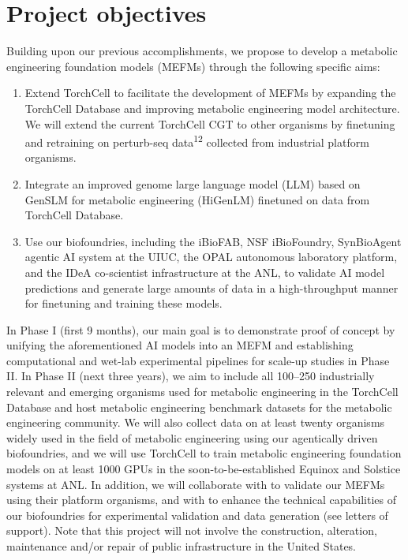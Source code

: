 
\section{Project objectives}\label{sec:objectives}

Building upon our previous accomplishments, we propose to develop a metabolic
engineering foundation models (MEFMs) through the following specific aims:

\begin{enumerate}
  \item Extend TorchCell to facilitate the development of MEFMs by expanding the
    TorchCell Database and improving metabolic engineering model architecture. We
    will extend the current TorchCell CGT to other organisms by finetuning and
    retraining on perturb-seq data\textsuperscript{12} collected from industrial
    platform organisms.
  \item Integrate an improved genome large language model (LLM) based on GenSLM for
    metabolic engineering (HiGenLM) finetuned on data from TorchCell Database.
  \item Use our biofoundries, including the iBioFAB, NSF iBioFoundry, SynBioAgent
    agentic AI system at the UIUC, the OPAL autonomous laboratory platform, and the
    IDeA co-scientist infrastructure at the ANL, to validate AI model predictions and
    generate large amounts of data in a high-throughput manner for finetuning and
    training these models.
\end{enumerate}

In Phase I (first 9 months), our main goal is to demonstrate proof of concept by
unifying the aforementioned AI models into an MEFM and establishing computational and
wet-lab experimental pipelines for scale-up studies in Phase II. In Phase II (next
three years), we aim to include all 100--250 industrially relevant and emerging
organisms used for metabolic engineering in the TorchCell Database and host metabolic
engineering benchmark datasets for the metabolic engineering community. We will also
collect data on at least twenty organisms widely used in the field of metabolic
engineering using our agentically driven biofoundries, and we will use TorchCell to
train metabolic engineering foundation models on at least 1000 GPUs in the
soon-to-be-established Equinox and Solstice systems at ANL. In addition, we will
collaborate with  to validate our MEFMs using their
platform organisms, and with  to enhance the technical
capabilities of our biofoundries for experimental validation and data generation (see
letters of support). Note that this project will not involve the construction,
alteration, maintenance and/or repair of public infrastructure in the United States.
